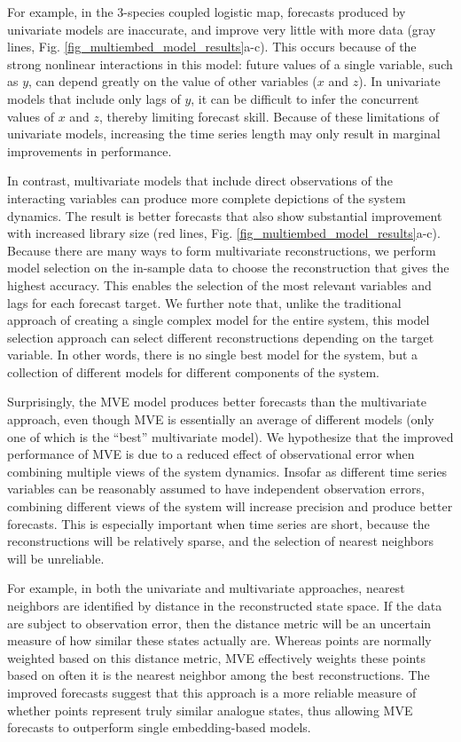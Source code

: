 For example, in the 3-species coupled logistic map, forecasts produced by univariate models are inaccurate, and improve very little with more data (gray lines, Fig. \ref{fig_multiembed_model_results}a-c). This occurs because of the strong nonlinear interactions in this model: future values of a single variable, such as $y$, can depend greatly on the value of other variables ($x$ and $z$). In univariate models that include only lags of $y$, it can be difficult to infer the concurrent values of $x$ and $z$, thereby limiting forecast skill. Because of these limitations of univariate models, increasing the time series length may only result in marginal improvements in performance.

In contrast, multivariate models that include direct observations of the interacting variables can produce more complete depictions of the system dynamics.  The result is better forecasts that also show substantial improvement with increased library size (red lines, Fig. \ref{fig_multiembed_model_results}a-c). Because there are many ways to form multivariate reconstructions, we perform model selection on the in-sample data to choose the reconstruction that gives the highest accuracy. This enables the selection of the most relevant variables and lags for each forecast target. We further note that, unlike the traditional approach of creating a single complex model for the entire system, this model selection approach can select different reconstructions depending on the target variable. In other words, there is no single best model for the system, but a collection of different models for different components of the system.

Surprisingly, the MVE model produces better forecasts than the multivariate approach, even though MVE is essentially an average of different models (only one of which is the ``best'' multivariate model). We hypothesize that the improved performance of MVE is due to a reduced effect of observational error when combining multiple views of the system dynamics. Insofar as different time series variables can be reasonably assumed to have independent observation errors, combining different views of the system will increase precision and produce better forecasts. This is especially important when time series are short, because the reconstructions will be relatively sparse, and the selection of nearest neighbors will be unreliable. 

For example, in both the univariate and multivariate approaches, nearest neighbors are identified by distance in the reconstructed state space. If the data are subject to observation error, then the distance metric will be an uncertain measure of how similar these states actually are. Whereas points are normally weighted based on this distance metric, MVE effectively weights these points based on often it is the nearest neighbor among the best reconstructions. The improved forecasts suggest that this approach is a more reliable measure of whether points represent truly similar analogue states, thus allowing MVE forecasts to outperform single embedding-based models.

